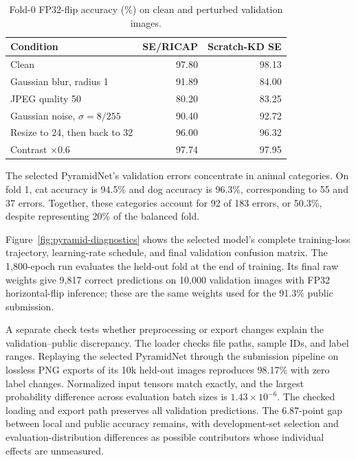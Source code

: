 \documentclass[letterpaper]{article} %
\begin{document}
\begin{table}[tb]
\centering\small
\begin{tabular}{lrr}
\toprule
Condition & SE/RICAP & Scratch-KD SE\\
\midrule
Clean & 97.80 & 98.13\\
Gaussian blur, radius 1 & 91.89 & 84.00\\
JPEG quality 50 & 80.20 & 83.25\\
Gaussian noise, $\sigma=8/255$ & 90.40 & 92.72\\
Resize to 24, then back to 32 & 96.00 & 96.32\\
Contrast $\times0.6$ & 97.74 & 97.95\\
\bottomrule
\end{tabular}
\caption{Fold-0 FP32-flip accuracy (\%) on clean and perturbed validation images.}
\label{tab:robust}
\end{table}

The selected PyramidNet's validation errors concentrate in animal categories. On fold 1, cat accuracy is 94.5\% and dog accuracy is 96.3\%, corresponding to 55 and 37 errors. Together, these categories account for 92 of 183 errors, or 50.3\%, despite representing 20\% of the balanced fold.

Figure~\ref{fig:pyramid-diagnostics} shows the selected model's complete training-loss trajectory, learning-rate schedule, and final validation confusion matrix. The 1,800-epoch run evaluates the held-out fold at the end of training. Its final raw weights give 9,817 correct predictions on 10,000 validation images with FP32 horizontal-flip inference; these are the same weights used for the 91.3\% public submission.


A separate check tests whether preprocessing or export changes explain the validation--public discrepancy. The loader checks file paths, sample IDs, and label ranges. Replaying the selected PyramidNet through the submission pipeline on lossless PNG exports of its 10k held-out images reproduces 98.17\% with zero label changes. Normalized input tensors match exactly, and the largest probability difference across evaluation batch sizes is $1.43\times10^{-6}$. The checked loading and export path preserves all validation predictions. The 6.87-point gap between local and public accuracy remains, with development-set selection and evaluation-distribution differences as possible contributors whose individual effects are unmeasured.
\end{document}

